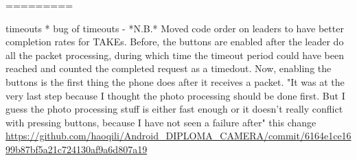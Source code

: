 =========

timeouts
* bug of timeouts
    - *N.B.* Moved code order on leaders to have better completion rates for TAKEs. Before, the buttons are enabled after the leader do all the packet processing, during which time the timeout period could have been reached and counted the completed request as a timedout. Now, enabling the buttons is the first thing the phone does after it receives a packet.
        "It was at the very last step because I thought the photo processing should be done first. But I guess the photo processing stuff is either fast enough or it doesn't really conflict with pressing buttons, because I have not seen a failure after" this change
        {\url{https://github.com/haoqili/Android_DIPLOMA_CAMERA/commit/6164e1ce1699b87bf5a21c724130af9a6d807a19}}
